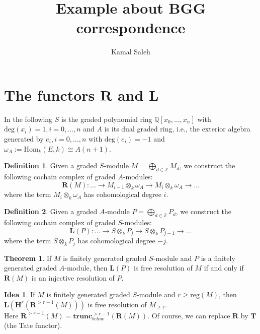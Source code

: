 \documentclass[16pt,a4paper]{extarticle}
\title{Example about BGG correspondence}
\author{Kamal Saleh}
\theoremstyle{definition}
\newtheorem{definition}{Definition}
\newtheorem{idea}{Idea}
\theoremstyle{theorem}
\newtheorem{theorem}{Theorem}
\newcommand{\LL}{\mathbf{L}}
\newcommand{\HH}{\mathbf{H}}
\newcommand{\RR}{\mathbf{R}}
\newcommand{\TT}{\mathbf{T}}
\newcommand{\trunc}{\mathbf{trunc}}
\begin{document}
    \maketitle
    \tableofcontents
    \section{The functors $\RR$ and $\LL$}
    In the following $S$ is the graded polynomial ring $\mathbb{Q}[x_0,\dots,x_n]$ with 
    $\mathrm{deg}(x_i)=1,i=0,\dots,n$ and $A$ is its dual graded ring, i.e., the exterior algebra
    generated by $e_i,i=0,\dots,n$ with $\mathrm{deg}(e_i)=-1$ and $\omega_A := \mathrm{Hom}_k(E,k)\cong A(n+1)$.
    \begin{definition}
        Given a graded $S$-module $M=\bigoplus_{d\in\mathbb{Z}} M_d$, we construct the following cochain complex of graded $A$-modules:
        $$\RR(M):\dots \rightarrow M_{i-1}\otimes_k \omega_A\rightarrow M_{i}\otimes_k \omega_A \rightarrow \dots$$
        where the term $M_{i}\otimes_k \omega_A$ has cohomological degree $i$.
    \end{definition}
    \begin{definition}
        Given a graded $A$-module $P=\bigoplus_{d\in\mathbb{Z}} P_d$, we construct the following cochain complex of graded $S$-modules:
        $$\LL(P):\dots \rightarrow S \otimes_k P_{j}\rightarrow S \otimes_k P_{j-1} \rightarrow \dots$$
        where the term  $S \otimes_k P_{j}$ has cohomological degree $-j$.
    \end{definition}
    \begin{theorem}
        If $M$ is finitely generated graded $S$-module and $P$ is a finitely generated graded $A$-module, then $\LL(P)$ is free resolution of $M$ if and 
        only if $\RR(M)$ is an injective resolution of $P$.
    \end{theorem}
    \begin{idea}
        If $M$ is finitely generated graded $S$-module and $r\geq\mathrm{reg}(M)$, then $\LL(\HH^r( \RR^{> r-1}(M)) )$ is free resolution of $M_{\geq r}$.\\
        Here $\RR^{> r-1}(M) = \trunc^{> r-1}_{below}(\RR(M))$.
        Of course, we can replace $\RR$ by $\TT$ (the Tate functor).
    \end{idea}
\end{document}
